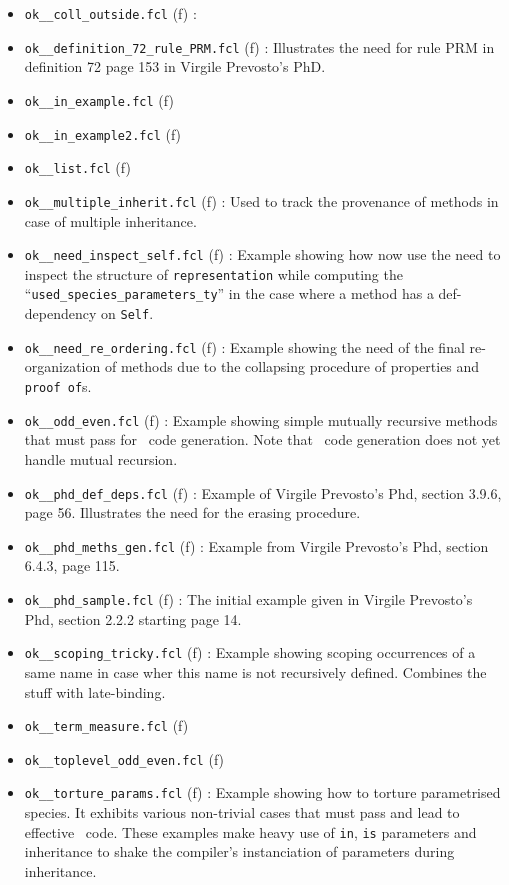 \begin{itemize}
\begin{itemize}
    {\bf several} arguments but are hardly different from the syntax
    point of view.
  \item {\tt ok\_\_coll\_outside.fcl} (f) :
  \item {\tt ok\_\_definition\_72\_rule\_PRM.fcl} (f) : Illustrates
    the need for rule PRM in definition 72 page 153 in Virgile
    Prevosto's PhD.
    \item {\tt ok\_\_in\_example.fcl} (f)
    \item {\tt ok\_\_in\_example2.fcl} (f)
    \item {\tt ok\_\_list.fcl} (f)
    \item {\tt ok\_\_multiple\_inherit.fcl} (f) : Used to track the
      provenance of methods in case of multiple inheritance.
    \item {\tt ok\_\_need\_inspect\_self.fcl} (f) : Example showing
      how now use the need to inspect the structure of
      {\tt representation} while computing the \\
      ``{\tt used\_species\_parameters\_ty}'' in the case where a
      method has a  def-dependency on {\tt Self}.
    \item {\tt ok\_\_need\_re\_ordering.fcl} (f) : Example showing the
      need of the final re-organization of methods due to the
      collapsing procedure of properties and {\tt proof of}s.
    \item {\tt ok\_\_odd\_even.fcl} (f) : Example showing simple
      mutually recursive methods that must pass for \ocaml\ code
      generation. Note that \coq\ code generation does not yet handle
      mutual recursion.
    \item {\tt ok\_\_phd\_def\_deps.fcl} (f) : Example of Virgile
      Prevosto's Phd, section 3.9.6, page 56. Illustrates the need for
      the erasing procedure.
    \item {\tt ok\_\_phd\_meths\_gen.fcl} (f) : Example from Virgile
      Prevosto's Phd, section 6.4.3, page 115.
    \item {\tt ok\_\_phd\_sample.fcl} (f) : The initial example given
      in Virgile Prevosto's Phd, section 2.2.2 starting page 14.
    \item {\tt ok\_\_scoping\_tricky.fcl} (f) : Example showing
      scoping occurrences of a same name in case wher this name is not
      recursively defined. Combines the stuff with late-binding.
    \item {\tt ok\_\_term\_measure.fcl} (f)
    \item {\tt ok\_\_toplevel\_odd\_even.fcl} (f)
    \item {\tt ok\_\_torture\_params.fcl} (f) : Example showing how to
      torture parametrised species. It exhibits various non-trivial
      cases that must pass and lead to effective \ocaml\/\coq\
      code. These examples make heavy use of {\tt in}, {\tt is}
      parameters and inheritance to shake the compiler's instanciation
      of parameters during inheritance.
  \end{itemize}
\end{itemize}

